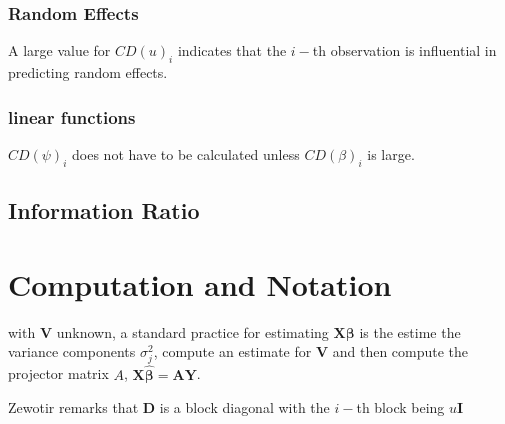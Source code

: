 \documentclass[Main.tex]{subfiles}
\begin{document}
	
	\newpage
	\subsubsection{Random Effects}
	
	A large value for $CD(u)_i$ indicates that the $i-$th observation is influential in predicting random effects.
	
	\subsubsection{linear functions}
	
	$CD(\psi)_i$ does not have to be calculated unless $CD(\beta)_i$ is large.
	
	
	\subsection{Information Ratio}
	
	
	\newpage
	\section{Computation and Notation } %
	with $\boldsymbol{V}$ unknown, a standard practice for estimating $\boldsymbol{X \beta}$ is the estime the variance components $\sigma^2_j$,
	compute an estimate for $\boldsymbol{V}$ and then compute the projector matrix $A$, $\boldsymbol{X \hat{\beta}}  = \boldsymbol{AY}$.
	
	
	Zewotir remarks that $\boldsymbol{D}$ is a block diagonal with the $i-$th block being $u \boldsymbol{I}$
\end{document}
